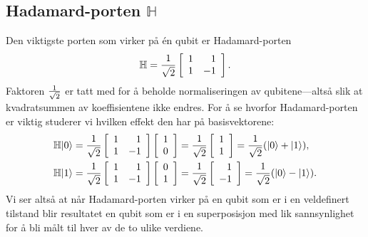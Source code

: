 \subsection{Hadamard-porten $\mathbb{H}$}
Den viktigste porten som virker på \'en qubit er Hadamard-porten
\begin{displaymath}
	\mathbb{H} = \frac{1}{\sqrt{2}} \left[\begin{array}{rr}1 & 1 \\ 1 & -1 \end{array}\right].
\end{displaymath}
Faktoren $\frac{1}{\sqrt{2}}$ er tatt med for å beholde normaliseringen av qubitene---altså slik at kvadratsummen av koeffisientene ikke endres. For å se hvorfor Hadamard-porten er viktig studerer vi hvilken effekt den har på basisvektorene:
\begin{align*}
	\mathbb{H}|0\rangle &= \frac{1}{\sqrt{2}}\left[\begin{array}{rr}1 & 1 \\ 1 & -1 \end{array}\right]\left[\begin{array}{r} 1 \\ 0\end{array}\right] 
	= \frac{1}{\sqrt{2}}\left[\begin{array}{r} 1 \\ 1\end{array}\right] = \frac{1}{\sqrt{2}}(|0\rangle + |1\rangle), \\
	\mathbb{H}|1\rangle &= \frac{1}{\sqrt{2}}\left[\begin{array}{rr}1 & 1 \\ 1 & -1 \end{array}\right]\left[\begin{array}{r} 0 \\ 1\end{array}\right] 
	= \frac{1}{\sqrt{2}}\left[\begin{array}{r} 1 \\ -1\end{array}\right] = \frac{1}{\sqrt{2}}(|0\rangle - |1\rangle).
\end{align*}
Vi ser altså at når Hadamard-porten virker på en qubit som er i en veldefinert tilstand blir resultatet en qubit som er i en superposisjon med lik sannsynlighet for å bli målt til hver av de to ulike verdiene.

